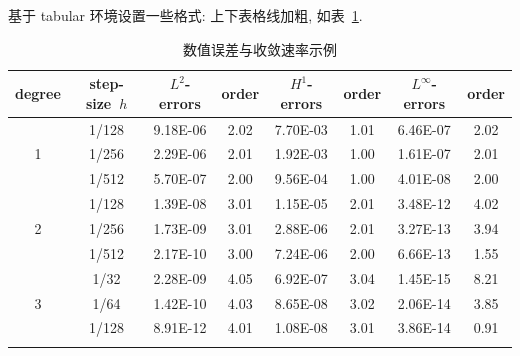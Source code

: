 \documentclass[UTF8,openany]{ctexbook}
\numberwithin{equation}{chapter}
\numberwithin{figure}{chapter}
\numberwithin{table}{chapter}
\theoremstyle{mystyle}
\begin{document}
\clearpage
基于 tabular 环境设置一些格式: 上下表格线加粗, 如表~\ref{tab:error1}.
\begin{table}[!htp]
\centering
\caption{数值误差与收敛速率示例}
\label{tab:error1}
\begin{tabular}{c|c|cc|cc|cc}
\Xhline{2\arrayrulewidth}
degree & step-size~$h$ & $L^2$-errors & order & $H^1$-errors & order & $L^\infty$-errors & order \\
\hline
  & 1/128 & 9.18E-06 & 2.02 & 7.70E-03 & 1.01  & 6.46E-07 & 2.02 \\
1 & 1/256 & 2.29E-06 & 2.01 & 1.92E-03 & 1.00  & 1.61E-07 & 2.01 \\
  & 1/512 & 5.70E-07 & 2.00 & 9.56E-04 & 1.00  & 4.01E-08 & 2.00 \\
\hline
  & 1/128 & 1.39E-08 & 3.01 & 1.15E-05 & 2.01  & 3.48E-12 & 4.02 \\
2 & 1/256 & 1.73E-09 & 3.01 & 2.88E-06 & 2.01  & 3.27E-13 & 3.94 \\
  & 1/512 & 2.17E-10 & 3.00 & 7.24E-06 & 2.00  & 6.66E-13 & 1.55 \\
\hline
  & 1/32  & 2.28E-09 & 4.05 & 6.92E-07 & 3.04  & 1.45E-15 & 8.21 \\
3 & 1/64  & 1.42E-10 & 4.03 & 8.65E-08 & 3.02  & 2.06E-14 & 3.85 \\
  & 1/128 & 8.91E-12 & 4.01 & 1.08E-08 & 3.01  & 3.86E-14 & 0.91 \\
\Xhline{2\arrayrulewidth}
\end{tabular}
\end{table}
\end{document}
